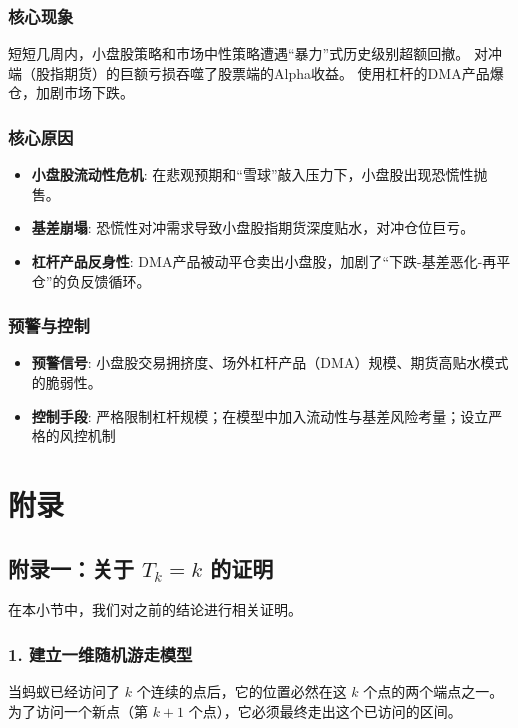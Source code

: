 \documentclass[UTF8]{ctexart}
\begin{document}
\subsubsection*{核心现象}

短短几周内，小盘股策略和市场中性策略遭遇“暴力”式历史级别超额回撤。
对冲端（股指期货）的巨额亏损吞噬了股票端的Alpha收益。
使用杠杆的DMA产品爆仓，加剧市场下跌。


\subsubsection*{核心原因}
\begin{itemize}
    \item \textbf{小盘股流动性危机}: 在悲观预期和“雪球”敲入压力下，小盘股出现恐慌性抛售。
    \item \textbf{基差崩塌}: 恐慌性对冲需求导致小盘股指期货深度贴水，对冲仓位巨亏。
    \item \textbf{杠杆产品反身性}: DMA产品被动平仓卖出小盘股，加剧了“下跌-基差恶化-再平仓”的负反馈循环。
\end{itemize}

\subsubsection*{预警与控制}
\begin{itemize}
    \item \textbf{预警信号}: 小盘股交易拥挤度、场外杠杆产品（DMA）规模、期货高贴水模式的脆弱性。
    \item \textbf{控制手段}:
  严格限制杠杆规模；在模型中加入流动性与基差风险考量；设立严格的风控机制
\end{itemize}


\section*{附录}

\subsection*{附录一：关于 $T_k=k$ 的证明}

在本小节中，我们对之前的结论进行相关证明。

\subsubsection*{1. 建立一维随机游走模型}
当蚂蚁已经访问了 $k$ 个连续的点后，它的位置必然在这 $k$ 个点的两个端点之一。为了访问一个新点（第 $k+1$ 个点），它必须最终走出这个已访问的区间。
\end{document}
